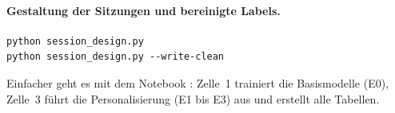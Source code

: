 \paragraph{Gestaltung der Sitzungen und bereinigte Labels.}
\begin{verbatim}
python session_design.py
python session_design.py --write-clean
\end{verbatim}

Einfacher geht es mit dem Notebook : Zelle~1 trainiert
die Basismodelle (E0), Zelle~3 führt die Personalisierung (E1 bis E3) aus und
erstellt alle Tabellen.


